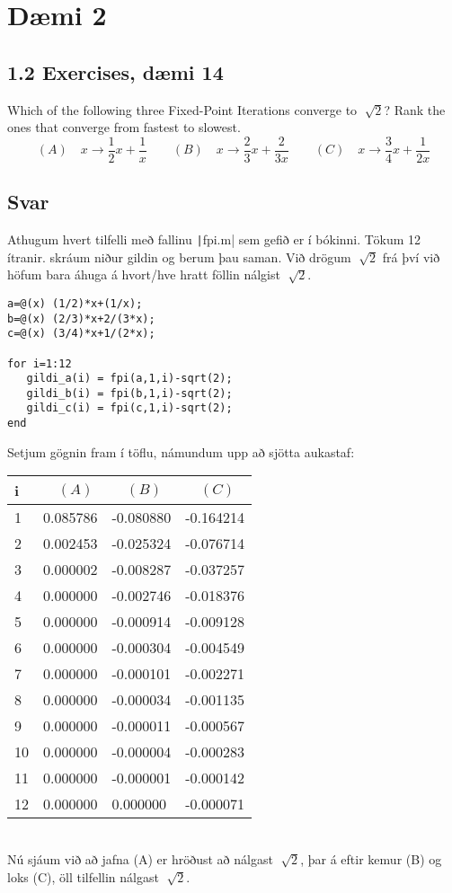 \documentclass[11pt]{article}
\begin{document}
\section*{Dæmi 2}
\subsection*{1.2 Exercises, dæmi 14}
Which of the following three Fixed-Point Iterations converge to $\sqrt[]{2}$? Rank the ones that converge from fastest to slowest.\\
$$(A)\quad x\rightarrow \frac 12 x+\frac 1x \qquad (B)\quad x\rightarrow \frac 23 x+\frac{2}{3x} \qquad (C)\quad x\rightarrow \frac 34 x + \frac{1}{2x} $$
\subsection*{Svar}
Athugum hvert tilfelli með fallinu \texttt|fpi.m| sem gefið er í bókinni. Tökum 12 ítranir. skráum niður gildin og berum þau saman. Við drögum $\sqrt[]{2}$ frá því við höfum bara áhuga á hvort/hve hratt föllin nálgist $\sqrt[]{2}$.
\begin{verbatim}
a=@(x) (1/2)*x+(1/x);
b=@(x) (2/3)*x+2/(3*x);
c=@(x) (3/4)*x+1/(2*x);

for i=1:12
   gildi_a(i) = fpi(a,1,i)-sqrt(2);
   gildi_b(i) = fpi(b,1,i)-sqrt(2);
   gildi_c(i) = fpi(c,1,i)-sqrt(2);
end
\end{verbatim}
Setjum gögnin fram í töflu, námundum upp að sjötta aukastaf:
\begin{table}[h]
\centering
\begin{tabular}{ l l l l}
\hline
i 		& $\quad(A)$ & $\quad(B)$ & $\quad(C)$\\
\hline
1  	& 0.085786 	& -0.080880 & -0.164214\\
2 	& 0.002453	& -0.025324 & -0.076714\\
3	& 0.000002 	& -0.008287 & -0.037257\\
4	& 0.000000	& -0.002746 & -0.018376\\
5	& 0.000000	& -0.000914 & -0.009128\\
6	& 0.000000	& -0.000304 & -0.004549\\
7	& 0.000000	& -0.000101 & -0.002271\\
8	& 0.000000	& -0.000034 & -0.001135\\
9	& 0.000000	& -0.000011 & -0.000567\\
10	& 0.000000	& -0.000004 & -0.000283\\
11	& 0.000000	& -0.000001 & -0.000142\\
12	& 0.000000	& 0.000000 & -0.000071\\
\hline
\end{tabular}
\end{table}\\
Nú sjáum við að jafna (A) er hröðust að nálgast $\sqrt[]{2}$, þar á eftir kemur (B) og loks (C), öll tilfellin nálgast $\sqrt[]{2}$.
\end{document}

